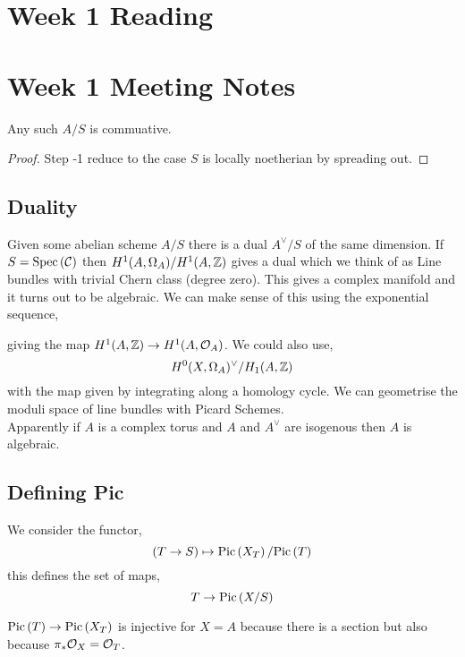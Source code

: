 \documentclass[12pt]{article}
\begin{document}
\section{Week 1 Reading}

\section{Week 1 Meeting Notes}
\begin{prop}
Any such $A / S$ is commuative.
\end{prop}

\begin{proof}
Step -1 reduce to the case $S$ is locally noetherian by spreading out.
\end{proof}

\subsection{Duality}

Given some abelian scheme $A / S$ there is a dual $A^\vee / S$ of the same dimension. If $S = \mathrm{Spec}\left( \mathcal{C} \right)$ then $H^1(A, \Omega_A) / H^1(A, \mathbb{Z})$ gives a dual which we think of as Line bundles with trivial Chern class (degree zero). This gives a complex manifold and it turns out to be algebraic. We can make sense of this using the exponential sequence,
\begin{center}
\end{center} 
giving the map $H^1(A, \mathbb{Z}) \to H^1(A, \mathcal{O}_{A})$. We could also use,
\[ H^0(X, \Omega_A)^\vee / H_1(A, \mathbb{Z}) \]
with the map given by integrating along a homology cycle.
 We can geometrise the moduli space of line bundles with Picard Schemes. 
\bigskip\\
Apparently if $A$ is a complex torus and $A$ and $A^\vee$ are isogenous then $A$ is algebraic.

\subsection{Defining Pic}

We consider the functor, 
\[ (T \to S) \mapsto \mathrm{Pic} \left( X_T \right) / \mathrm{Pic} \left( T \right) \]
this defines the set of maps,
\[ T \to \mathrm{Pic} \left( X/S \right) \]

\begin{rmk}
$\mathrm{Pic} \left( T \right) \to \mathrm{Pic} \left( X_T \right)$ is injective for $X = A$ because there is a section but also because $\pi_* \mathcal{O}_{X} = \mathcal{O}_{T}$. 
\end{rmk}
\end{document}
